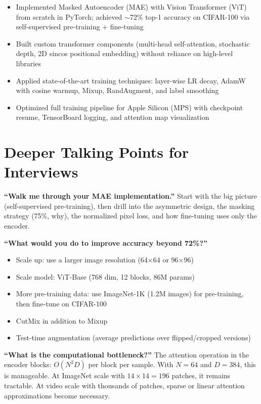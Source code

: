 \documentclass[12pt, a4paper]{report}
\begin{document}
\begin{itemize}
    \item Implemented Masked Autoencoder (MAE) with Vision Transformer (ViT) from scratch in PyTorch; achieved $\sim$72\% top-1 accuracy on CIFAR-100 via self-supervised pre-training + fine-tuning
    \item Built custom transformer components (multi-head self-attention, stochastic depth, 2D sincos positional embedding) without reliance on high-level libraries
    \item Applied state-of-the-art training techniques: layer-wise LR decay, AdamW with cosine warmup, Mixup, RandAugment, and label smoothing
    \item Optimized full training pipeline for Apple Silicon (MPS) with checkpoint resume, TensorBoard logging, and attention map visualization
\end{itemize}

\section{Deeper Talking Points for Interviews}

\textbf{``Walk me through your MAE implementation.''}
Start with the big picture (self-supervised pre-training), then drill into the asymmetric design, the masking strategy (75\%, why), the normalized pixel loss, and how fine-tuning uses only the encoder.

\textbf{``What would you do to improve accuracy beyond 72\%?''}
\begin{itemize}
    \item Scale up: use a larger image resolution (64×64 or 96×96)
    \item Scale model: ViT-Base (768 dim, 12 blocks, 86M params)
    \item More pre-training data: use ImageNet-1K (1.2M images) for pre-training, then fine-tune on CIFAR-100
    \item CutMix in addition to Mixup
    \item Test-time augmentation (average predictions over flipped/cropped versions)
\end{itemize}

\textbf{``What is the computational bottleneck?''}
The attention operation in the encoder blocks: $O(N^2 D)$ per block per sample. With $N=64$ and $D=384$, this is manageable. At ImageNet scale with $14 \times 14 = 196$ patches, it remains tractable. At video scale with thousands of patches, sparse or linear attention approximations become necessary.
\end{document}
